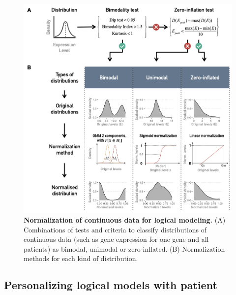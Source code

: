 \documentclass[a4paper,12pt,twoside,onecolumn,openright,final,oldfontcommands]{memoir}
\begin{document}
\begin{figure}

{\centering \includegraphics[width=0.8\linewidth]{fig/logical-processing} 

}

\caption[Normalization of continuous data for logical modeling]{\textbf{Normalization of continuous
data for logical modeling.} (A) Combinations of tests and criteria to
classify distributions of continuous data (such as gene expression for
one gene and all patients) as bimodal, unimodal or zero-inflated. (B)
Normalization methods for each kind of distribution.}\label{fig:logical-processing}
\end{figure}







\subsection{Personalizing logical models with
patient}\label{personalizing-logical-models-with-patient}
\end{document}
